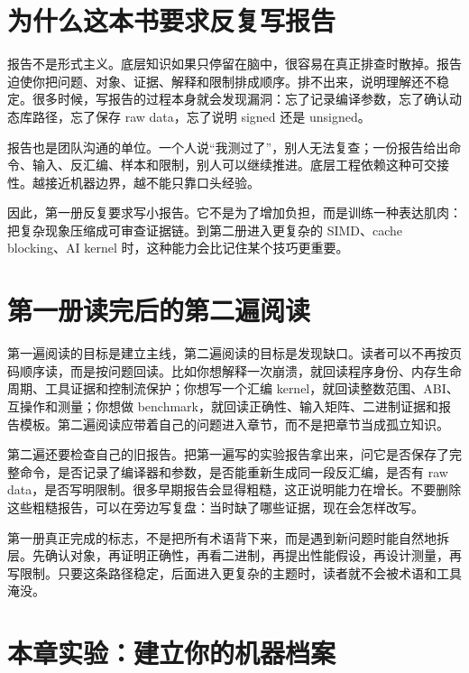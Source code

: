 \section{为什么这本书要求反复写报告}

报告不是形式主义。底层知识如果只停留在脑中，很容易在真正排查时散掉。报告迫使你把问题、对象、证据、解释和限制排成顺序。排不出来，说明理解还不稳定。很多时候，写报告的过程本身就会发现漏洞：忘了记录编译参数，忘了确认动态库路径，忘了保存 raw data，忘了说明 signed 还是 unsigned。

报告也是团队沟通的单位。一个人说“我测过了”，别人无法复查；一份报告给出命令、输入、反汇编、样本和限制，别人可以继续推进。底层工程依赖这种可交接性。越接近机器边界，越不能只靠口头经验。

因此，第一册反复要求写小报告。它不是为了增加负担，而是训练一种表达肌肉：把复杂现象压缩成可审查证据链。到第二册进入更复杂的 SIMD、cache blocking、AI kernel 时，这种能力会比记住某个技巧更重要。

\section{第一册读完后的第二遍阅读}

第一遍阅读的目标是建立主线，第二遍阅读的目标是发现缺口。读者可以不再按页码顺序读，而是按问题回读。比如你想解释一次崩溃，就回读程序身份、内存生命周期、工具证据和控制流保护；你想写一个汇编 kernel，就回读整数范围、ABI、互操作和测量；你想做 benchmark，就回读正确性、输入矩阵、二进制证据和报告模板。第二遍阅读应带着自己的问题进入章节，而不是把章节当成孤立知识。

第二遍还要检查自己的旧报告。把第一遍写的实验报告拿出来，问它是否保存了完整命令，是否记录了编译器和参数，是否能重新生成同一段反汇编，是否有 raw data，是否写明限制。很多早期报告会显得粗糙，这正说明能力在增长。不要删除这些粗糙报告，可以在旁边写复盘：当时缺了哪些证据，现在会怎样改写。

第一册真正完成的标志，不是把所有术语背下来，而是遇到新问题时能自然地拆层。先确认对象，再证明正确性，再看二进制，再提出性能假设，再设计测量，再写限制。只要这条路径稳定，后面进入更复杂的主题时，读者就不会被术语和工具淹没。

\section{本章实验：建立你的机器档案}

